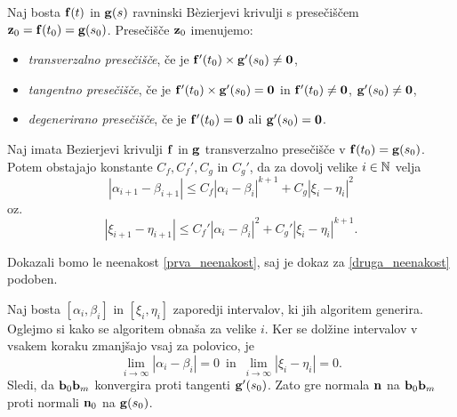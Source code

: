 \begin{definicija}
Naj bosta ${\bf f}(t)$ in ${\bf g}(s)$ ravninski B\`{e}zierjevi krivulji s presečiščem ${\bf z}_0 = {\bf f}(t_0) = {\bf g}(s_0)$. Presečišče ${\bf z}_0$ imenujemo:
\begin{itemize}
	\setlength\itemsep{0.33em}
\item {\em transverzalno presečišče}, če je ${\bf f}'(t_0)\times {\bf g}'(s_0) \neq {\bf 0}$,
\smallskip
\item {\em tangentno presečišče}, če je ${\bf f}'(t_0)\times {\bf g}'(s_0) = {\bf 0}$ in ${\bf f}'(t_0)\neq {\bf 0}$, ${\bf g}'(s_0)\neq {\bf 0}$, 
\smallskip
\item {\em degenerirano presečišče}, če je ${\bf f}'(t_0) = {\bf 0}$ ali ${\bf g}'(s_0) = {\bf 0}$.
\end{itemize}
\end{definicija}


\begin{trditev}
Naj imata Bezierjevi krivulji ${\bf f}$ in ${\bf g}$ transverzalno presečišče v ${\bf f}(t_0)={\bf g}(s_0)$. Potem obstajajo konstante $C_f, C_f', C_g$ in $C_g'$, da za dovolj velike $i\in \mathbb N$ velja
\begin{equation}\label{prva_neenakost}
|\alpha _{i+1} - \beta _{i+1}| \leq C_f |\alpha _{i} - \beta _{i}|^{k+1} + C_g|\xi _{i} - \eta _{i}|^2
\end{equation}
oz.
\begin{equation}\label{druga_neenakost}
|\xi _{i+1} - \eta _{i+1}| \leq C_f' |\alpha _{i} - \beta _{i}|^{2} + C_g'|\xi _{i} - \eta _{i}|^{k+1}.
\end{equation}
\end{trditev}

\proof
Dokazali bomo le neenakost \ref{prva_neenakost}, saj je dokaz za \ref{druga_neenakost} podoben. 

Naj bosta $[\alpha _i,\beta _i]$ in $[\xi _i,\eta _i]$ zaporedji intervalov, ki jih algoritem generira. Oglejmo si kako se algoritem obnaša za velike $i$. Ker se dolžine intervalov v vsakem koraku zmanjšajo vsaj za polovico, je 
\begin{equation*}
\lim _{i\rightarrow \infty} |\alpha _i-\beta _i| = 0 \,\text{ in }\, \lim _{i\rightarrow \infty} |\xi _i - \eta _i| = 0.
\end{equation*}
 Sledi, da ${\bf b}_0{\bf b}_m$ konvergira proti tangenti ${\bf g}'(s_0)$. Zato gre normala ${\bf n}$ na ${\bf b}_0{\bf b}_m$ proti normali ${\bf n}_0$ na ${\bf g}(s_0)$.

